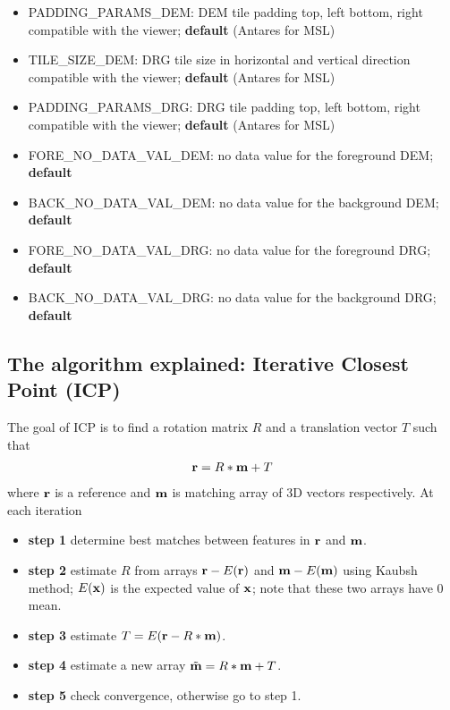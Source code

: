 \begin{itemize}
        \item{\textsc{PADDING\_PARAMS\_DEM}}: DEM tile padding top, left bottom, right compatible with the viewer; {\bf default} (Antares for MSL)
        \item{\textsc{TILE\_SIZE\_DEM}}: DRG tile size in horizontal and vertical direction compatible with the viewer; {\bf default} (Antares for MSL)
	\item{\textsc{PADDING\_PARAMS\_DRG}}: DRG tile padding top, left bottom, right compatible with the viewer; {\bf default} (Antares for MSL)
        \item{\textsc{FORE\_NO\_DATA\_VAL\_DEM}}: no data value for the foreground DEM; {\bf default}
        \item{\textsc{BACK\_NO\_DATA\_VAL\_DEM}}: no data value for the background DEM; {\bf default}
        \item{\textsc{FORE\_NO\_DATA\_VAL\_DRG}}: no data value for the foreground DRG; {\bf default}
        \item{\textsc{BACK\_NO\_DATA\_VAL\_DRG}}: no data value for the background DRG; {\bf default}

\end{itemize}


\subsection{The algorithm explained: Iterative Closest Point (ICP)}
The goal of ICP is to find a rotation matrix $R$ and a translation vector $T$ such that 
\begin{eqnarray}
{\bf r} = R*{\bf m}+T
\end{eqnarray}
where $\bf r$ is a reference and $\bf m$ is matching array of 3D vectors respectively.
At each iteration
\begin{itemize}
\item {\bf step 1} determine best matches between features in $\bf r$ and $\bf m$.
\item {\bf step 2} estimate $R$ from arrays ${\bf r} - E({\bf r})$ and ${\bf m}-E({\bf m})$ using Kaubsh method; $E({\bf x})$ is the expected value of $\bf x$;
                   note that these two arrays have 0 mean.
\item {\bf step 3} estimate $T=E({\bf r}-R*{\bf m})$.
\item {\bf step 4} estimate a new array $\tilde{\bf m} = R*{\bf m} + T$.
\item {\bf step 5} check convergence, otherwise go to step 1.
\end{itemize}


